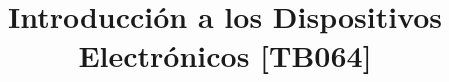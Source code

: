 \documentclass[10pt,a4paper,twocolumn]{article}
\title{Introducción a los Dispositivos Electrónicos [TB064]}
\begin{document}
\date{} 
\maketitle





\end{document}
